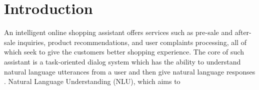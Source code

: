 \section{Introduction}
\label{sec:intro}

An intelligent online shopping assistant
offers services such as pre-sale and after-sale inquiries, 
product recommendations, and user complaints processing,
all of which seek to give the customers better shopping experience.
The core of such assistant is a task-oriented dialog system which 
has the ability to understand natural language utterances
from a user and then give natural language responses \cite{yan2017building}.
Natural Language Understanding (NLU), which aims to 
